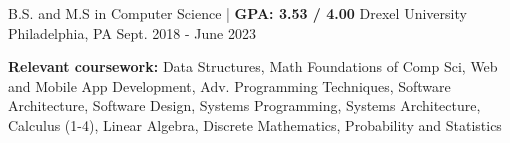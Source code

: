 

\begin{cventries}

  \cventry
  {B.S. and M.S in Computer Science | \textbf{ GPA: 3.53 / 4.00}} %
  {Drexel University} %
  {Philadelphia, PA} %
  {Sept. 2018 - June 2023} %
  {
    \begin{cvitems} %
      \item {\color{darktext} \textbf{Relevant coursework:}}
      Data Structures, Math Foundations of Comp Sci, Web and Mobile App Development, Adv. Programming Techniques,
      Software Architecture, Software Design, Systems Programming, Systems Architecture,
      Calculus (1-4), Linear Algebra, Discrete Mathematics, Probability and Statistics
    \end{cvitems}
  }

\end{cventries}
